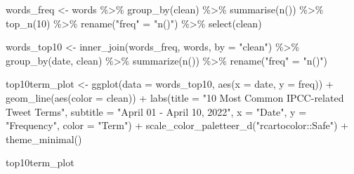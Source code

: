\documentclass[
]{article}
\newenvironment{Shaded}{\begin{snugshade}}{\end{snugshade}}
\newcommand{\AttributeTok}[1]{\textcolor[rgb]{0.77,0.63,0.00}{#1}}
\newcommand{\DecValTok}[1]{\textcolor[rgb]{0.00,0.00,0.81}{#1}}
\newcommand{\FunctionTok}[1]{\textcolor[rgb]{0.00,0.00,0.00}{#1}}
\newcommand{\NormalTok}[1]{#1}
\newcommand{\OtherTok}[1]{\textcolor[rgb]{0.56,0.35,0.01}{#1}}
\newcommand{\SpecialCharTok}[1]{\textcolor[rgb]{0.00,0.00,0.00}{#1}}
\newcommand{\StringTok}[1]{\textcolor[rgb]{0.31,0.60,0.02}{#1}}
\begin{document}
\begin{Shaded}
\begin{Highlighting}[]
\NormalTok{words\_freq }\OtherTok{\textless{}{-}}\NormalTok{ words }\SpecialCharTok{\%\textgreater{}\%} 
  \FunctionTok{group\_by}\NormalTok{(clean) }\SpecialCharTok{\%\textgreater{}\%} 
  \FunctionTok{summarise}\NormalTok{(}\FunctionTok{n}\NormalTok{()) }\SpecialCharTok{\%\textgreater{}\%} 
  \FunctionTok{top\_n}\NormalTok{(}\DecValTok{10}\NormalTok{) }\SpecialCharTok{\%\textgreater{}\%} 
  \FunctionTok{rename}\NormalTok{(}\StringTok{"freq"} \OtherTok{=} \StringTok{"n()"}\NormalTok{) }\SpecialCharTok{\%\textgreater{}\%} 
  \FunctionTok{select}\NormalTok{(clean)}

\NormalTok{words\_top10 }\OtherTok{\textless{}{-}} \FunctionTok{inner\_join}\NormalTok{(words\_freq, words, }\AttributeTok{by =} \StringTok{"clean"}\NormalTok{) }\SpecialCharTok{\%\textgreater{}\%} 
  \FunctionTok{group\_by}\NormalTok{(date, clean) }\SpecialCharTok{\%\textgreater{}\%} 
  \FunctionTok{summarize}\NormalTok{(}\FunctionTok{n}\NormalTok{()) }\SpecialCharTok{\%\textgreater{}\%} 
  \FunctionTok{rename}\NormalTok{(}\StringTok{"freq"} \OtherTok{=} \StringTok{"n()"}\NormalTok{)}
\end{Highlighting}
\end{Shaded}

\begin{Shaded}
\begin{Highlighting}[]
\NormalTok{top10term\_plot }\OtherTok{\textless{}{-}} \FunctionTok{ggplot}\NormalTok{(}\AttributeTok{data =}\NormalTok{ words\_top10, }\FunctionTok{aes}\NormalTok{(}\AttributeTok{x =}\NormalTok{ date, }\AttributeTok{y =}\NormalTok{ freq)) }\SpecialCharTok{+}
  \FunctionTok{geom\_line}\NormalTok{(}\FunctionTok{aes}\NormalTok{(}\AttributeTok{color =}\NormalTok{ clean)) }\SpecialCharTok{+}
  \FunctionTok{labs}\NormalTok{(}\AttributeTok{title =} \StringTok{"10 Most Common IPCC{-}related Tweet Terms"}\NormalTok{,}
       \AttributeTok{subtitle =} \StringTok{"April 01 {-} April 10, 2022"}\NormalTok{,}
       \AttributeTok{x =} \StringTok{"Date"}\NormalTok{,}
       \AttributeTok{y =} \StringTok{"Frequency"}\NormalTok{,}
       \AttributeTok{color =} \StringTok{"Term"}\NormalTok{) }\SpecialCharTok{+}
  \FunctionTok{scale\_color\_paletteer\_d}\NormalTok{(}\StringTok{"rcartocolor::Safe"}\NormalTok{) }\SpecialCharTok{+}
  \FunctionTok{theme\_minimal}\NormalTok{() }

\NormalTok{top10term\_plot}
\end{Highlighting}
\end{Shaded}
\end{document}
